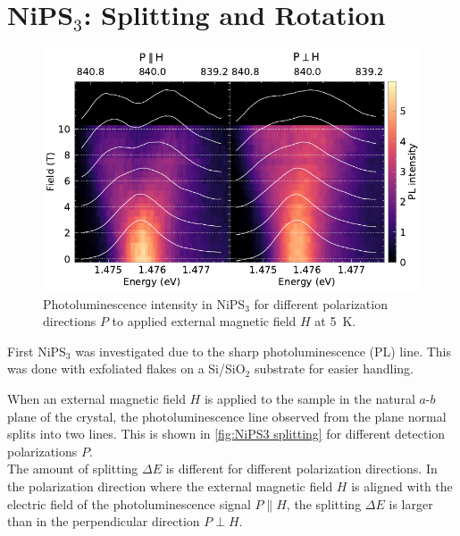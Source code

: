 \documentclass[
	twoside,
	parskip=half,
	a4paper,
]{scrbook}
\begin{document}
\section{NiPS$_3$: Splitting and Rotation}
\begin{figure}
	\centering
	\includegraphics{../figures/2024-04-10 NiPS4 splitting.pdf}
	\caption{
		Photoluminescence intensity in NiPS$_3$ for different polarization directions $P$ to applied external magnetic field $H$ at \SI{5}{K}.
	}
	\label{fig:NiPS3 splitting}
\end{figure}
First NiPS$_3$ was investigated due to the sharp photoluminescence (PL) line.
This was done with exfoliated flakes on a Si/SiO$_2$ substrate for easier handling.

When an external magnetic field $H$ is applied to the sample in the natural $a$-$b$ plane of the crystal, the photoluminescence line observed from the plane normal splits into two lines.
This is shown in \autoref{fig:NiPS3 splitting} for different detection polarizations $P$.\\
The amount of splitting $\Delta E$ is different for different polarization directions.
In the polarization direction where the external magnetic field $H$ is aligned with the electric field of the photoluminescence signal $P\parallel H$, the splitting $\Delta E$ is larger than in the perpendicular direction $P\perp H$.
\end{document}
